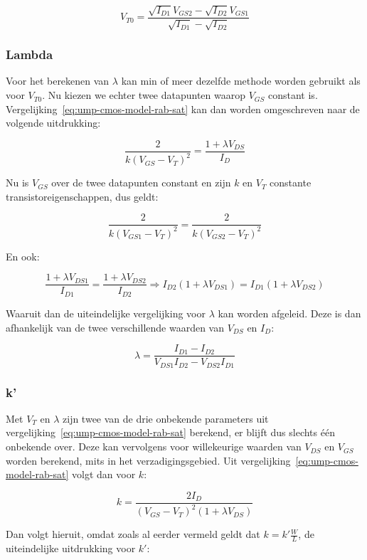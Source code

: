 \documentclass{article}
\begin{document}
\begin{equation} \label{eq:ump-vt0}
	V_{T0} = \frac{\sqrt{I_{D1}}V_{GS2} - \sqrt{I_{D2}}V_{GS1}}{\sqrt{I_{D1}} - \sqrt{I_{D2}}}
\end{equation}

\subsubsection{Lambda}
\label{subsubsec:ump-methode-verw-lambda}
Voor het berekenen van $\lambda$ kan min of meer dezelfde methode worden gebruikt als voor $V_{T0}$. Nu kiezen we echter twee datapunten waarop $V_{GS}$ constant is. Vergelijking~\ref{eq:ump-cmos-model-rab-sat} kan dan worden omgeschreven naar de volgende uitdrukking:

$$\frac{2}{k(V_{GS}-V_{T})^2} = \frac{1 + \lambda V_{DS}}{I_{D}}$$

Nu is $V_{GS}$ over de twee datapunten constant en zijn $k$ en $V_{T}$ constante transistoreigenschappen, dus geldt:

$$\frac{2}{k(V_{GS1}-V_{T})^2} = \frac{2}{k(V_{GS2}-V_{T})^2}$$

En ook:

$$\frac{1 + \lambda V_{DS1}}{I_{D1}} = \frac{1 + \lambda V_{DS2}}{I_{D2}} \Rightarrow I_{D2}(1 + \lambda V_{DS1}) = I_{D1}(1 + \lambda V_{DS2})$$

Waaruit dan de uiteindelijke vergelijking voor $\lambda$ kan worden afgeleid. Deze is dan afhankelijk van de twee verschillende waarden van $V_{DS}$ en $I_{D}$:

\begin{equation} \label{eq:ump-lambda}
	\lambda = \frac{I_{D1} - I_{D2}}{V_{DS1}I_{D2} - V_{DS2}I_{D1}}
\end{equation}

\subsubsection{k'}
\label{subsubsec:ump-methode-verw-kprime}
Met $V_{T}$ en $\lambda$ zijn twee van de drie onbekende parameters uit vergelijking~\ref{eq:ump-cmos-model-rab-sat} berekend, er blijft dus slechts één onbekende over. Deze kan vervolgens voor willekeurige waarden van $V_{DS}$ en $V_{GS}$ worden berekend, mits in het verzadigingsgebied. Uit vergelijking~\ref{eq:ump-cmos-model-rab-sat} volgt dan voor $k$:

$$k = \frac{2I_{D}}{(V_{GS} - V_{T})^2(1 + \lambda V_{DS})}$$

Dan volgt hieruit, omdat zoals al eerder vermeld geldt dat $k = k'\frac{W}{L}$, de uiteindelijke uitdrukking voor $k'$:
\end{document}
